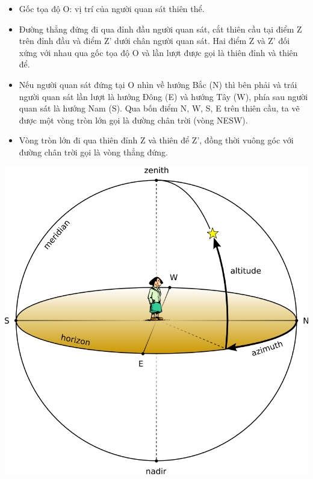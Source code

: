 \begin{minipage}[l]{0.6\textwidth}
	
	\begin{itemize}
		\item Gốc tọa độ O: vị trí của người quan sát thiên thể.
		\item Đường thẳng đứng đi qua đỉnh đầu người quan sát, cắt thiên cầu tại điểm Z trên đỉnh đầu và điểm Z' dưới chân người quan sát. Hai điểm Z và Z' đối xứng với nhau qua gốc tọa độ O và lần lượt được gọi là thiên đỉnh và thiên để.
		\item Nếu người quan sát đứng tại O nhìn về hướng Bắc (N) thì bên phải và trái người quan sát lần lượt là hướng Đông (E) và hướng Tây (W), phía sau người quan sát là hướng Nam (S). Qua bốn điểm N, W, S, E trên thiên cầu, ta vẽ được một vòng tròn lớn gọi là đường chân trời (vòng NESW).
		\item Vòng tròn lớn đi qua thiên đỉnh Z và thiên để Z', đồng thời vuông góc với đường chân trời gọi là vòng thẳng đứng.
	\end{itemize}
\end{minipage}
\begin{minipage}[r]{0.4\textwidth}
	\begin{center}
		\includegraphics[scale=0.2]{../figs/G10-033-1.png}
	\end{center}
\end{minipage}

